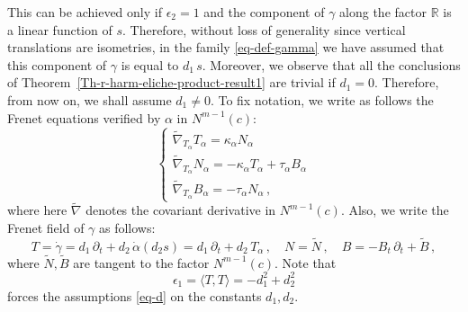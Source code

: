 \documentclass[11pt]{amsart}
\theoremstyle{plain}
\theoremstyle{definition}
\numberwithin{equation}{section}
\def \R{{\mathbb R}}
\begin{document}
This can be achieved only if $\epsilon_2=1$ and the component of $\gamma$ along the factor $\R$ is a linear function of $s$. Therefore, without loss of generality since vertical translations are isometries, in the family \eqref{eq-def-gamma} we have assumed that this component of $\gamma$ is equal to $d_1\,s$. Moreover, we observe that all the conclusions of Theorem~\ref{Th-r-harm-eliche-product-result1} are trivial if $d_1=0$. Therefore, from now on, we shall assume $d_1 \neq 0$. To fix notation, we write as follows the Frenet equations verified by $\alpha$ in $N^{m-1}(c)$:
\begin{equation}\label{Fren-eq-pseudo-alpha}
\begin{cases}
\widetilde{\nabla}_{T_\alpha} T_\alpha= \kappa_\alpha N_\alpha \\
\widetilde{\nabla}_{T_\alpha} N_\alpha=- \kappa_\alpha T_\alpha+\tau_\alpha B_\alpha\\
\widetilde{\nabla}_{T_\alpha} B_\alpha=-\tau_\alpha N_\alpha\,,
\end{cases}
\end{equation}
where here $\widetilde{\nabla}$ denotes the covariant derivative in $N^{m-1}(c)$. Also, we write the Frenet field of $\gamma$ as follows:
\[
T=\dot{\gamma}=d_1\, \partial_t+d_2 \,\dot{\alpha}(d_2s)= d_1\, \partial_t+d_2\, T_\alpha\,, \quad N=\widetilde{N}\,, \quad B=-B_t \,\partial_t + \widetilde{B}\,,
\]
where $\widetilde{N},\widetilde{B}$ are tangent to the factor $N^{m-1}(c)$. Note that
\[
\epsilon_1=\langle T,T \rangle= - d_1^2 +d_2^2
\]
forces the assumptions \eqref{eq-d} on the constants $d_1,d_2$.
\end{document}
